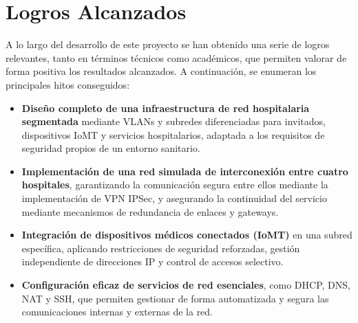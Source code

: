 \section{Logros Alcanzados}
A lo largo del desarrollo de este proyecto se han obtenido una serie de logros relevantes, tanto en términos técnicos como académicos, que permiten valorar de forma positiva 
los resultados alcanzados. A continuación, se enumeran los principales hitos conseguidos:
\begin{itemize}
    \item \textbf{Diseño completo de una infraestructura de red hospitalaria segmentada} mediante VLANs y subredes diferenciadas para invitados, dispositivos IoMT y servicios hospitalarios, adaptada a los requisitos de seguridad propios de un entorno sanitario.
    \item \textbf{Implementación de una red simulada de interconexión entre cuatro hospitales}, garantizando la comunicación segura entre ellos mediante la implementación de VPN IPSec, y asegurando la continuidad del servicio mediante mecanismos de redundancia de enlaces y gateways.
    \item \textbf{Integración de dispositivos médicos conectados (IoMT)} en una subred específica, aplicando restricciones de seguridad reforzadas, gestión independiente de direcciones IP y control de accesos selectivo.
    \item \textbf{Configuración eficaz de servicios de red esenciales}, como DHCP, DNS, NAT y SSH, que permiten gestionar de forma automatizada y segura las comunicaciones internas y externas de la red.
\end{itemize}

